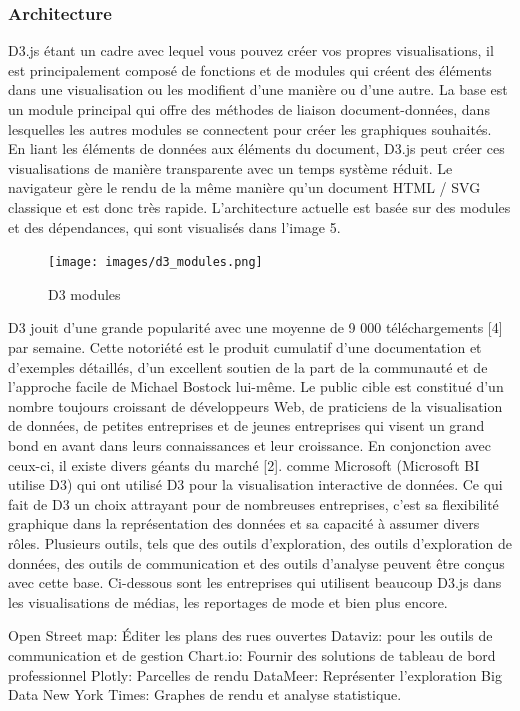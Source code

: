\documentclass[french, a4paper, 12pt]{report}
\begin{document}
\subsubsection{Architecture}
D3.js étant un cadre avec lequel vous pouvez créer vos propres visualisations, il est principalement composé de fonctions et de modules qui créent des éléments dans une visualisation ou les modifient d’une manière ou d’une autre. La base est un module principal qui offre des méthodes de liaison document-données, dans lesquelles les autres modules se connectent pour créer les graphiques souhaités. En liant les éléments de données aux éléments du document, D3.js peut créer ces visualisations de manière transparente avec un temps système réduit. Le navigateur gère le rendu de la même manière qu’un document HTML / SVG classique et est donc très rapide.
L'architecture actuelle est basée sur des modules et des dépendances, qui sont visualisés dans l'image 5.
\begin{figure}[!htp]
    \centering
    \texttt{[image: images/d3\_modules.png]}
    \caption{D3 modules}
    \label{fig:2.16}
\end{figure}
D3 jouit d'une grande popularité avec une moyenne de 9 000 téléchargements [4] par semaine. Cette notoriété est le produit cumulatif d’une documentation et d’exemples détaillés, d’un excellent soutien de la part de la communauté et de l’approche facile de Michael Bostock lui-même. Le public cible est constitué d'un nombre toujours croissant de développeurs Web, de praticiens de la visualisation de données, de petites entreprises et de jeunes entreprises qui visent un grand bond en avant dans leurs connaissances et leur croissance. En conjonction avec ceux-ci, il existe divers géants du marché [2]. comme Microsoft (Microsoft BI utilise D3) qui ont utilisé D3 pour la visualisation interactive de données. Ce qui fait de D3 un choix attrayant pour de nombreuses entreprises, c’est sa flexibilité graphique dans la représentation des données et sa capacité à assumer divers rôles. Plusieurs outils, tels que des outils d'exploration, des outils d'exploration de données, des outils de communication et des outils d'analyse peuvent être conçus avec cette base. Ci-dessous sont les entreprises qui utilisent beaucoup D3.js dans les visualisations de médias, les reportages de mode et bien plus encore.

Open Street map: Éditer les plans des rues ouvertes
Dataviz: pour les outils de communication et de gestion
Chart.io: Fournir des solutions de tableau de bord professionnel
Plotly: Parcelles de rendu
DataMeer: Représenter l'exploration Big Data
New York Times: Graphes de rendu et analyse statistique.
\end{document}
